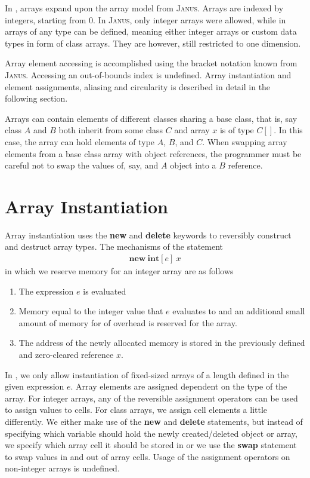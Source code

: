 In \rooplpp, arrays expand upon the array model from \textsc{Janus}. Arrays are indexed by integers, starting from 0. In \textsc{Janus}, only integer arrays were allowed, while in \rooplpp arrays of any type can be defined, meaning either integer arrays or custom data types in form of class arrays. They are however, still restricted to one dimension.

Array element accessing is accomplished using the bracket notation known from \textsc{Janus}. Accessing an out-of-bounds index is undefined.
Array instantiation and element assignments, aliasing and circularity is described in detail in the following section.

Arrays can contain elements of different classes sharing a base class, that is, say class $A$ and $B$ both inherit from some class $C$ and array $x$ is of type $C[]$. In this case, the array can hold elements of type $A$, $B$, and $C$. When swapping array elements from a base class array with object references, the programmer must be careful not to swap the values of, say, and $A$ object into a $B$ reference.

\section{Array Instantiation}
\label{sec:array-instantiation}
Array instantiation uses the \textbf{new} and \textbf{delete} keywords to reversibly construct and destruct array types. The mechanisms of the statement
\begin{align*}
\textbf{new}\ \textbf{int}[e]\ x
\end{align*} 
in which we reserve memory for an integer array are as follows

\begin{enumerate}
    \item The expression $e$ is evaluated
    \item Memory equal to the integer value that $e$ evaluates to and an additional small amount of memory for of overhead is reserved for the array.
    \item The address of the newly allocated memory is stored in the previously defined and zero-cleared reference $x$.
\end{enumerate}

In \rooplpp, we only allow instantiation of fixed-sized arrays of a length defined in the given expression $e$. Array elements are assigned dependent on the type of the array. For integer arrays, any of the reversible assignment operators can be used to assign values to cells. For class arrays, we assign cell elements a little differently. We either make use of the \textbf{new} and \textbf{delete} statements, but instead of specifying which variable should hold the newly created/deleted object or array, we specify which array cell it should be stored in or we use the \textbf{swap} statement to swap values in and out of array cells. Usage of the assignment operators on non-integer arrays is undefined.

